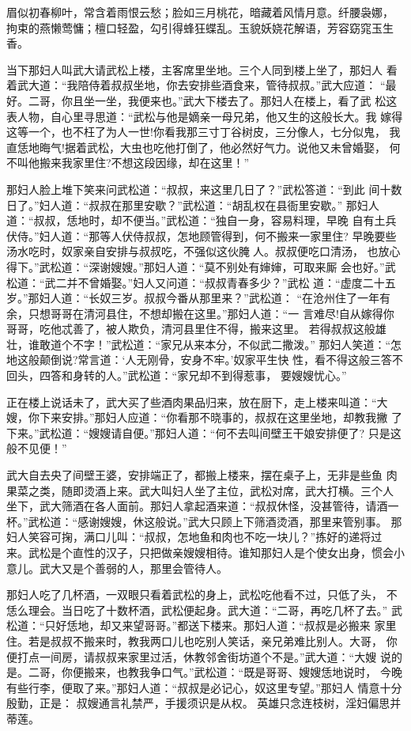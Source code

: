 眉似初春柳叶，常含着雨恨云愁；脸如三月桃花，暗藏着风情月意。纤腰袅娜，
拘束的燕懒莺慵；檀口轻盈，勾引得蜂狂蝶乱。玉貌妖娆花解语，芳容窈窕玉生香。

当下那妇人叫武大请武松上楼，主客席里坐地。三个人同到楼上坐了，那妇人
看着武大道：“我陪侍着叔叔坐地，你去安排些酒食来，管待叔叔。”武大应道：
“最好。二哥，你且坐一坐，我便来也。”武大下楼去了。那妇人在楼上，看了武
松这表人物，自心里寻思道：“武松与他是嫡亲一母兄弟，他又生的这般长大。我
嫁得这等一个，也不枉了为人一世!你看我那三寸丁谷树皮，三分像人，七分似鬼，
我直恁地晦气!据着武松，大虫也吃他打倒了，他必然好气力。说他又未曾婚娶，
何不叫他搬来我家里住?不想这段因缘，却在这里！”

那妇人脸上堆下笑来问武松道：“叔叔，来这里几日了？”武松答道：“到此
间十数日了。”妇人道：“叔叔在那里安歇？”武松道：“胡乱权在县衙里安歇。”
那妇人道：“叔叔，恁地时，却不便当。”武松道：“独自一身，容易料理，早晚
自有土兵伏侍。”妇人道：“那等人伏侍叔叔，怎地顾管得到，何不搬来一家里住?
早晚要些汤水吃时，奴家亲自安排与叔叔吃，不强似这伙腌人。叔叔便吃口清汤，
也放心得下。”武松道：“深谢嫂嫂。”那妇人道：“莫不别处有婶婶，可取来厮
会也好。”武松道：“武二并不曾婚娶。”妇人又问道：“叔叔青春多少？”武松
道：“虚度二十五岁。”那妇人道：“长奴三岁。叔叔今番从那里来？”武松道：
“在沧州住了一年有余，只想哥哥在清河县住，不想却搬在这里。”那妇人道：“一
言难尽!自从嫁得你哥哥，吃他忒善了，被人欺负，清河县里住不得，搬来这里。
若得叔叔这般雄壮，谁敢道个不字！”武松道：“家兄从来本分，不似武二撒泼。”
那妇人笑道：“怎地这般颠倒说?常言道：‘人无刚骨，安身不牢。’奴家平生快
性，看不得这般三答不回头，四答和身转的人。”武松道：“家兄却不到得惹事，
要嫂嫂忧心。”

正在楼上说话未了，武大买了些酒肉果品归来，放在厨下，走上楼来叫道：“大
嫂，你下来安排。”那妇人应道：“你看那不晓事的，叔叔在这里坐地，却教我撇
了下来。”武松道：“嫂嫂请自便。”那妇人道：“何不去叫间壁王干娘安排便了?
只是这般不见便！”

武大自去央了间壁王婆，安排端正了，都搬上楼来，摆在桌子上，无非是些鱼
肉果菜之类，随即烫酒上来。武大叫妇人坐了主位，武松对席，武大打横。三个人
坐下，武大筛酒在各人面前。那妇人拿起酒来道：“叔叔休怪，没甚管待，请酒一
杯。”武松道：“感谢嫂嫂，休这般说。”武大只顾上下筛酒烫酒，那里来管别事。
那妇人笑容可掬，满口儿叫：“叔叔，怎地鱼和肉也不吃一块儿？”拣好的递将过
来。武松是个直性的汉子，只把做亲嫂嫂相待。谁知那妇人是个使女出身，惯会小
意儿。武大又是个善弱的人，那里会管待人。

那妇人吃了几杯酒，一双眼只看着武松的身上，武松吃他看不过，只低了头，
不恁么理会。当日吃了十数杯酒，武松便起身。武大道：“二哥，再吃几杯了去。”
武松道：“只好恁地，却又来望哥哥。”都送下楼来。那妇人道：“叔叔是必搬来
家里住。若是叔叔不搬来时，教我两口儿也吃别人笑话，亲兄弟难比别人。大哥，
你便打点一间房，请叔叔来家里过活，休教邻舍街坊道个不是。”武大道：“大嫂
说的是。二哥，你便搬来，也教我争口气。”武松道：“既是哥哥、嫂嫂恁地说时，
今晚有些行李，便取了来。”那妇人道：“叔叔是必记心，奴这里专望。”那妇人
情意十分殷勤，正是：
叔嫂通言礼禁严，手援须识是从权。
英雄只念连枝树，淫妇偏思并蒂莲。

